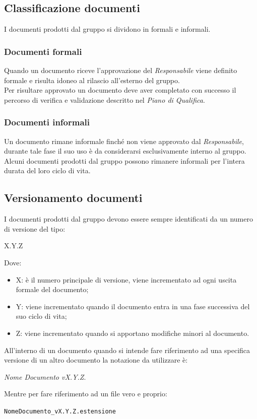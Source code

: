 \documentclass[a4paper]{report}
\begin{document}
	\subsection{Classificazione documenti}
	I documenti prodotti dal gruppo si dividono in formali e informali. 
	\subsubsection{Documenti formali}
	Quando un documento riceve l'approvazione del \emph{Responsabile} viene definito formale e risulta idoneo
	al rilascio all'esterno del gruppo. \\
	Per risultare approvato un documento deve aver completato con successo il percorso di verifica e validazione 
	descritto nel \emph{Piano di Qualifica}. 
	\subsubsection{Documenti informali}
	Un documento rimane informale finché non viene approvato dal \emph{Responsabile}, durante tale fase 
	il suo uso è da considerarsi esclusivamente interno al gruppo. \\
	Alcuni documenti prodotti dal gruppo possono rimanere informali per l'intera durata del loro ciclo di vita.
	\subsection{Versionamento documenti}
	I documenti prodotti dal gruppo devono essere sempre identificati da un numero di versione del tipo:
	\begin{center}
		X.Y.Z
	\end{center}
	Dove:
	\begin{itemize}
		\item X: è il numero principale di versione, viene incrementato ad ogni uscita formale del documento;
		\item Y: viene incrementato quando il documento entra in una fase successiva del suo ciclo di vita;
		\item Z: viene incrementato quando si apportano modifiche minori al documento.
	\end{itemize}
	All'interno di un documento quando si intende fare riferimento ad una specifica versione di un altro documento la
	notazione da utilizzare è: 
	\begin{center}
		\emph{Nome Documento vX.Y.Z}.
	\end{center}
	Mentre per fare riferimento ad un file vero e proprio:
	\begin{center}
		\verb|NomeDocumento_vX.Y.Z.estensione|
	\end{center}
\end{document}
